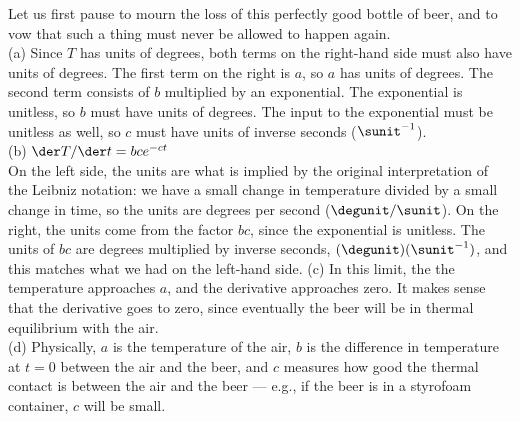 Let us first pause to mourn the loss of this perfectly good bottle of beer, and to
vow that such a thing must never be allowed to happen again.\\
(a) Since $T$ has units of degrees, both terms on the right-hand side must also have
units of degrees. The first term on the right is $a$, so $a$ has units of degrees.
The second term consists of $b$ multiplied by an exponential. The exponential is
unitless, so $b$ must have units of degrees. The input to the exponential must be
unitless as well, so $c$ must have units of inverse seconds ($\sunit^{-1}$).\\
(b) $\der T/\der t=bce^{-ct}$\\
On the left side, the units are what is implied by the original interpretation of
the Leibniz notation: we have a small change in temperature divided by a small change
in time, so the units are degrees per second ($\degunit/\sunit$). On the right, the
units come from the factor $bc$, since the exponential is unitless. The units of
$bc$ are degrees multiplied by inverse seconds, $(\degunit)(\sunit^{-1})$, and this
matches what we had on the left-hand side.
(c) In this limit, the the temperature approaches $a$, and the derivative approaches zero.
It makes sense that the derivative goes to zero, since eventually the beer will be
in thermal equilibrium with the air.\\
(d) Physically, $a$ is the temperature of the air, $b$ is the difference in
temperature at $t=0$ between the air and the beer, and $c$ measures how good
the thermal contact is between the air and the beer --- e.g., if the beer is in
a styrofoam container, $c$ will be small.
